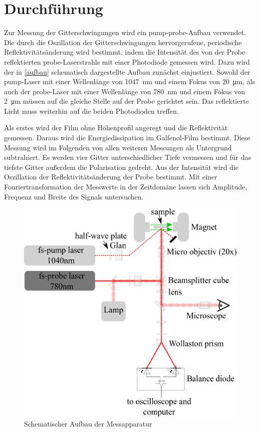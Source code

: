 \section{Durchf\"{u}hrung}

Zur Messung der Gitterschwingungen wird ein pump-probe-Aufbau verwendet. Die durch die Oszillation der Gitterschwingungen hervorgerufene, periodische Reflektivitätsänderung wird bestimmt, indem die Intensität des von der Probe reflektierten probe-Laserstrahls mit einer Photodiode gemessen wird. Dazu wird der in \autoref{aufbau} schematisch dargestellte Aufbau zunächst einjustiert. Sowohl der pump-Laser mit einer Wellenlänge von \SI{1047}{\nano\metre} und einem Fokus von \SI{20}{\micro\metre}, als auch der probe-Laser mit einer Wellenlänge von \SI{780}{\nano\metre} und einem Fokus von \SI{2}{\micro\metre} müssen auf die gleiche Stelle auf der Probe gerichtet sein. Das reflektierte Licht muss weiterhin auf die beiden Photodioden treffen.\par
Als erstes wird der Film ohne Höhenprofil angeregt und die Reflektivität gemessen. Daraus wird die Energiedissipation im Galfenol-Film bestimmt. Diese Messung wird im Folgenden von allen weiteren Messungen als Untergrund subtrahiert. Es werden vier Gitter unterschiedlicher Tiefe vermessen und für das tiefste Gitter außerdem die Polarisation gedreht. Aus der Intensität wird die Oszillation der Reflektivitätsänderung der Probe bestimmt. Mit einer Fouriertransformation der Messwerte in der Zeitdomäne lassen sich Amplitude, Frequenz und Breite des Signals untersuchen.
\begin{figure}
  \includegraphics[width=\textwidth]{img/aufbau.png}
  \caption{Schematischer Aufbau der Messapparatur \cite{FP}}
  \label{aufbau}
\end{figure}

\FloatBarrier
